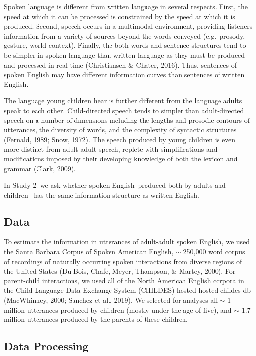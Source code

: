 \documentclass[10pt, letterpaper]{article}
\begin{document}
Spoken language is different from written language in several respects.
First, the speed at which it can be processed is constrained by the
speed at which it is produced. Second, speech occurs in a multimodal
environment, providing listeners information from a variety of sources
beyond the words conveyed (e.g.~prosody, gesture, world context).
Finally, the both words and sentence structures tend to be simpler in
spoken language than written language as they must be produced and
processed in real-time (Christiansen \& Chater, 2016). Thus, sentences
of spoken English may have different information curves than sentences
of written English.

The language young children hear is further different from the language
adults speak to each other. Child-directed speech tends to simpler than
adult-directed speech on a number of dimensions including the lengths
and prosodic contours of utterances, the diversity of words, and the
complexity of syntactic structures (Fernald, 1989; Snow, 1972). The
speech produced by young children is even more distinct from adult-adult
speech, replete with simplifications and modifications imposed by their
developing knowledge of both the lexicon and grammar (Clark, 2009).

In Study 2, we ask whether spoken English--produced both by adults and
children-- has the same information structure as written English.

\hypertarget{data-1}{%
\subsection{Data}\label{data-1}}

To estimate the information in utterances of adult-adult spoken English,
we used the Santa Barbara Corpus of Spoken American English, \(\sim\)
250,000 word corpus of recordings of naturally occurring spoken
interactions from diverse regions of the United States (Du Bois, Chafe,
Meyer, Thompson, \& Martey, 2000). For parent-child interactions, we
used all of the North American English corpora in the Child Language
Data Exchange System (CHILDES) hosted hosted childes-db (MacWhinney,
2000; Sanchez et al., 2019). We selected for analyses all \(\sim\) 1
million utterances produced by children (mostly under the age of five),
and \(\sim\) 1.7 million utterances produced by the parents of these
children.

\hypertarget{data-processing}{%
\subsection{Data Processing}\label{data-processing}}
\end{document}
